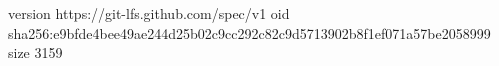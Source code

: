 version https://git-lfs.github.com/spec/v1
oid sha256:e9bfde4bee49ae244d25b02c9cc292c82c9d5713902b8f1ef071a57be2058999
size 3159
